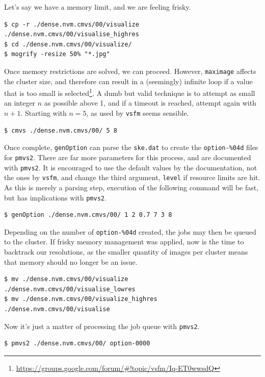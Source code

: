 Let's say we have a memory limit, and we are feeling frisky.

\begin{lstlisting}
$ cp -r ./dense.nvm.cmvs/00/visualize ./dense.nvm.cmvs/00/visualise_highres
$ cd ./dense.nvm.cmvs/00/visualize/
$ mogrify -resize 50% "*.jpg"
\end{lstlisting}

Once memory restrictions are solved, we can proceed. However, {\tt maximage} affects the cluster size, and therefore can result in a (seemingly) infinite loop if a value that is too small is selected\footnote{\url{https://groups.google.com/forum/\#!topic/vsfm/Iq-ET0wwsdQ}}. A dumb but valid technique is to attempt as small an integer $n$ as possible above 1, and if a timeout is reached, attempt again with $n+1$. Starting with $n=5$, as used by {\tt vsfm} seems sensible.

\begin{lstlisting}
$ cmvs ./dense.nvm.cmvs/00/ 5 8
\end{lstlisting}

Once complete, {\tt genOption} can parse the {\tt ske.dat} to create the {\tt option-\%04d} files for {\tt pmvs2}. There are far more parameters for this process, and are documented with {\tt pmvs2}. It is encouraged to use the default values by the documentation, not the ones by {\tt vsfm}, and change the third argument, {\tt level} if resource limits are hit. As this is merely a parsing step, execution of the following command will be fast, but has implications with {\tt pmvs2}.

\begin{lstlisting}
$ genOption ./dense.nvm.cmvs/00/ 1 2 0.7 7 3 8
\end{lstlisting}

Depending on the number of {\tt option-\%04d} created, the jobs may then be queued to the cluster. If frisky memory management was applied, now is the time to backtrack our resolutions, as the smaller quantity of images per cluster means that memory should no longer be an issue.

\begin{lstlisting}
$ mv ./dense.nvm.cmvs/00/visualize ./dense.nvm.cmvs/00/visualise_lowres
$ mv ./dense.nvm.cmvs/00/visualize_highres ./dense.nvm.cmvs/00/visualise
\end{lstlisting}

Now it's just a matter of processing the job queue with {\tt pmvs2}.

\begin{lstlisting}
$ pmvs2 ./dense.nvm.cmvs/00/ option-0000
\end{lstlisting}

